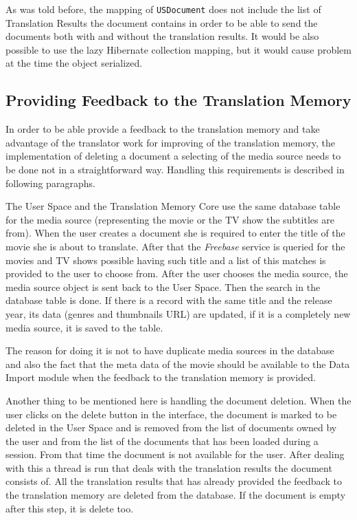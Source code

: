 As was told before, the mapping of {\tt USDocument} does not include the list of Translation Results the document contains in order to be able to send the documents both with and without the translation results. It would be also possible to use the lazy Hibernate collection mapping, but it would cause problem at the time the object serialized.

\subsection{Providing Feedback to the Translation Memory}

In order to be able provide a feedback to the translation memory and take advantage of the translator work for improving of the translation memory, the implementation of deleting a document a selecting of the media source needs to be done not in a straightforward way. Handling this requirements is described in following paragraphs.

The User Space and the Translation Memory Core use the same database table for the media source (representing the movie or the TV show the subtitles are from). When the user creates a document she is required to enter the title of the movie she is about to translate. After that the {\it Freebase} service is queried for the movies and TV shows possible having such title and a list of this matches is provided to the user to choose from. After the user chooses the media source, the media source object is sent back to the User Space. Then the search in the database table is done. If there is a record with the same title and the release year, its data (genres and thumbnails URL) are updated, if it is a completely new media source, it is saved to the table.

The reason for doing it is not to have duplicate media sources in the database and also the fact that the meta data of the movie should be available to the Data Import module when the feedback to the translation memory is provided.

Another thing to be mentioned here is handling the document deletion. When the user clicks on the delete button in the interface, the document is marked to be deleted in the User Space and is removed from the list of documents owned  by the user and from the list of the documents that has been loaded during a session. From that time the document is not available for the user. After dealing with this a thread is run that deals with the translation results the document consists of. All the translation results that has already provided the feedback to the translation memory are deleted from the database. If the document is empty after this step, it is delete too.

